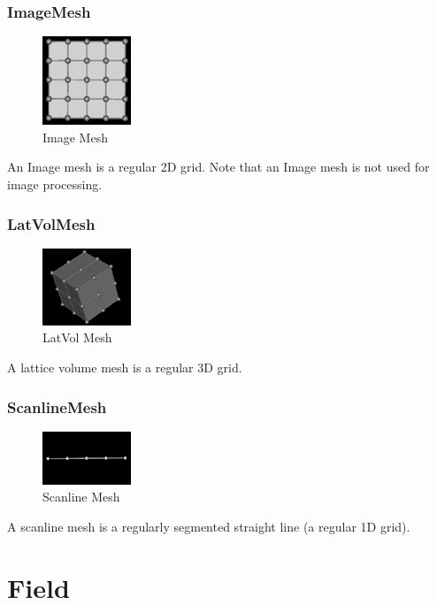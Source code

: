 \documentclass[fleqn,12pt,openany]{book}
\begin{document}
\subsubsection{ImageMesh}
\begin{figure}[H]\label{imagemesh}
\includegraphics{UserGuide_figures/ImageField.png}
\caption{Image Mesh}
\end{figure}

An Image mesh is a regular 2D grid.
Note that an Image mesh is not used for image processing.

\subsubsection{LatVolMesh}
\begin{figure}[H]\label{latvolmesh}
\includegraphics{UserGuide_figures/LatticeVol.png}
\caption{LatVol Mesh}
\end{figure}

A lattice volume mesh is a regular 3D grid.

\subsubsection{ScanlineMesh}
\begin{figure}[H]\label{scanlinemesh}
\includegraphics{UserGuide_figures/ScanlineField.png}
\caption{Scanline Mesh}
\end{figure}

A scanline mesh is a regularly segmented straight line (a regular 1D grid).

\section{Field}
\end{document}
